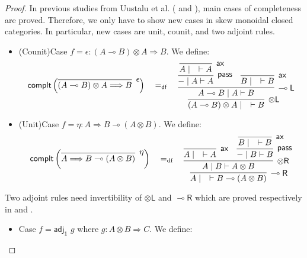 \documentclass[submission,copyright,creativecommons]{eptcs}
\newcommand{\tl}{\otimes \mathsf{L}}
\newcommand{\tr}{\otimes \mathsf{R}}
\newcommand{\lleft}{\multimap \mathsf{L}}
\newcommand{\pass}{\mathsf{pass}}
\newcommand{\ax}{\mathsf{ax}}
\newcommand{\ot}{\otimes}
\newcommand{\lolli}{\multimap}
\newcommand{\defeq}{=_{\mathsf{df}}}
\begin{document}
\begin{proof}
In previous studies from Uustalu et al. (\cite{uustalu:sequent:2018} and \cite{uustalu:deductive:nodate}), main cases of completeness are proved.
Therefore, we only have to show new cases in skew monoidal closed categories.
In particular, new cases are unit, counit, and two adjoint rules.
\begin{itemize}
  \item (Counit)Case $f = \epsilon : (A\multimap B)\otimes A \Longrightarrow B$. We define:
  \begin{displaymath}
    \mathsf{complt} \left(
                    \infer[\epsilon]{(A\multimap B)\otimes A \Longrightarrow B}{}
                    \right)
                    \quad
                    \defeq
                    \quad
                    \vcenter{
                    \infer[\tl]{(A\multimap B) \otimes A \mid \quad \vdash B}{
                      \infer[\lleft]{A\multimap B \mid A \vdash B}{
                        \infer[\pass]{- \mid A \vdash A}{
                          \infer[\ax]{A \mid \quad \vdash A}{}
                        }
                        &
                        \infer[\ax]{B \mid \quad \vdash B}{}
                      }
                    }
                    }
  \end{displaymath}
  \item (Unit)Case $f = \eta : A \Longrightarrow B \multimap (A\otimes B)$. We define:
  \begin{displaymath}
    \mathsf{complt} \left(
                    \infer[\eta]{A \Longrightarrow B \lolli (A \ot B)}{}
                    \right)
                    \quad
                    =_{\text{df}}
                    \quad
                    \vcenter{
                    \infer[\multimap \mathsf{R}]{A \mid \quad \vdash B \multimap (A\otimes B)}{
                      \infer[\tr]{A \mid B \vdash A\otimes B}{
                        \infer[\ax]{A \mid \quad \vdash A}{}
                        &
                        \infer[\pass]{- \mid B \vdash B}{
                          \infer[\ax]{B \mid \quad \vdash B}{}
                        }
                      }
                    }
                    }
  \end{displaymath}
\end{itemize}
Two adjoint rules need invertibility of $\otimes \mathsf{L}$ and $\multimap \mathsf{R}$ which are proved respectively in \cite{uustalu:sequent:2018} and \cite{uustalu:deductive:nodate}.
\begin{itemize}
  \item Case $f = \mathsf{adj_1}$ $g$ where $g : A\otimes B \Longrightarrow C$. We define:

\end{itemize}
\end{proof}
\end{document}
